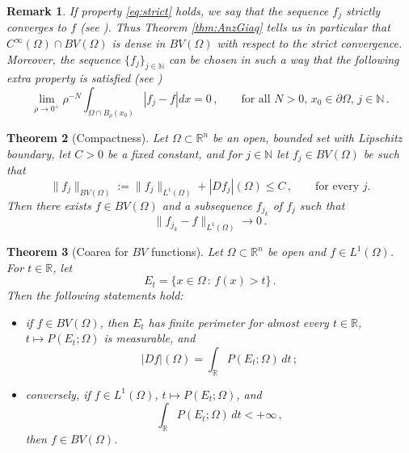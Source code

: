 \documentclass[a4paper,reqno,11pt]{amsart}
\newtheorem{theorem}{Theorem}[section]
\newtheorem{remark}[theorem]{Remark}
\newcommand{\N}{\mathbb{N}}
\newcommand{\R}{\mathbb{R}}
\newcommand{\de}{\partial}
\newcommand{\p}{P}
\begin{document}
\begin{remark} \label{rem:strict}
If property \eqref{eq:strict} holds, we say that the sequence $f_{j}$ \emph{strictly converges} to $f$ (see \cite[Definition 3.14]{AmbrosioFuscoPallara2000}). 
Thus Theorem \ref{thm:AnzGiaq} tells us in particular that $C^{\infty}(\Omega) \cap BV(\Omega)$ is dense in $BV(\Omega)$ with respect to the strict convergence.
Moreover, the sequence $\{ f_{j} \}_{j \in \N}$ can be chosen in such a way that the following extra property is satisfied (see \cite[Remark 1.18]{Giu84book})
\begin{equation} \label{eq:AnzGiaqboosted}
	\lim_{\rho \rightarrow 0^{+}} \rho^{-N} \int_{\Omega \cap B_{\rho}(x_0)} |f_{j} - f| dx = 0 \, , \qquad \text{for all $N > 0$, $x_{0} \in \de \Omega$, $j \in \N \, .$}
\end{equation} 
\end{remark}
\begin{theorem}[Compactness]
Let $\Omega \subset \R^{n}$ be an open, bounded set with Lipschitz boundary, let $C > 0$ be a fixed constant, and for $j\in\N$ let $f_{j}\in BV(\Omega)$ be such that
\begin{equation*} 
\|f_{j}\|_{BV(\Omega)} := \|f_{j}\|_{L^{1}(\Omega)} + |Df_{j}|(\Omega) \leq C \, , \qquad \text{for every $j$.}
\end{equation*}
Then there exists $f \in BV(\Omega)$ and a subsequence $f_{j_{k}}$ of $f_{j}$ such that
\begin{equation*}
\|f_{j_{k}} - f\|_{L^{1}(\Omega)} \rightarrow 0 \, .
\end{equation*}
\end{theorem}

\begin{theorem}[Coarea for $BV$ functions] \label{thm:coarea}
		Let $\Omega \subset \R^{n}$ be open and $f \in L^{1}(\Omega)$. For $t \in \R$, let
		\begin{equation*}
			E_{t} = \{ x \in \Omega \, : \, f(x) > t \} \, .
		\end{equation*}
		Then the following statements hold:
		\begin{itemize}
			\item[(i)] if $f \in BV(\Omega)$, then $E_{t}$ has finite perimeter for almost every $t \in \R$, $t \mapsto \p(E_{t};\Omega)$ is measurable, and
			\begin{equation*}
				|Df|(\Omega) = \int_{\R} \p(E_{t};\Omega)\, dt \, ;
			\end{equation*}
			\item[(ii)] conversely, if $f \in L^{1}(\Omega)$, $t \mapsto \p(E_{t};\Omega)$, and
			\begin{equation*}
				\int_{\R} \p(E_{t};\Omega)\, dt < + \infty \, ,
			\end{equation*}
			then $f \in BV(\Omega)$.
		\end{itemize}
\end{theorem}
\end{document}
